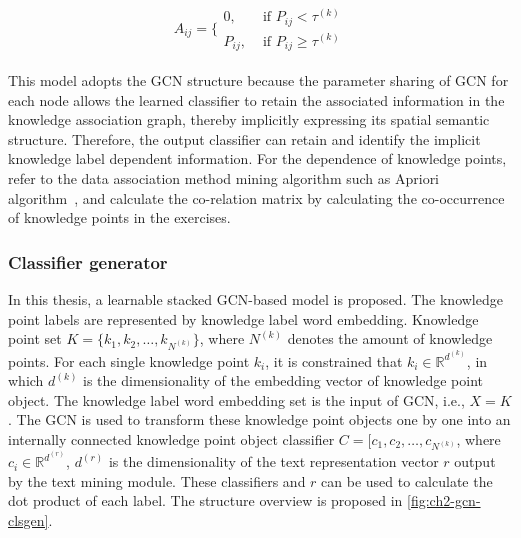 \begin{align}
	A_{ij}=\{\begin{array}{ll}
		0,      & \text{ if } P_{ij}<\tau^{(k)}      \\
		P_{ij}, & \text{ if } P_{ij} \geq \tau^{(k)}
	\end{array}\label{fml:confidence}
\end{align}



This model adopts the GCN structure because the parameter sharing of GCN for each node allows the learned classifier to retain the associated information in the knowledge association graph, thereby implicitly expressing its spatial semantic structure. Therefore, the output classifier can retain and identify the implicit knowledge label dependent information. For the dependence of knowledge points, refer to the data association method mining algorithm such as Apriori algorithm~\cite{panjaitan2019implementation}, and calculate the co-relation matrix by calculating the co-occurrence of knowledge points in the exercises.


\subsubsection{Classifier generator}


In this thesis, a learnable stacked GCN-based model is proposed. The knowledge point labels are represented by knowledge label word embedding. Knowledge point set \(K=\{k_1,k_2,\ldots,k_{N^{(k)}}\} \), where \(N^{(k)}\) denotes the amount of knowledge points. For each single knowledge point \(k_i\), it is constrained that \(k_i \in \mathbb{R}^ {d^{(k)}}\), in which \(d^{(k)}\) is the dimensionality of the embedding vector of knowledge point object. The knowledge label word embedding set is the input of GCN, i.e., \(X = K\). The GCN is used to transform these knowledge point objects one by one into an internally connected knowledge point object classifier \(C=[c_1,c_2,\ldots,c_{N^{(k)}}\), where \(c_i \in \mathbb {R}^{d^{(r)}}\), \(d^{(r)}\) is the dimensionality of the text representation vector \(r\) output by the text mining module. These classifiers and \(r\) can be used to calculate the dot product of each label. The structure overview is proposed in \figurename{\ref{fig:ch2-gcn-clsgen}}.

